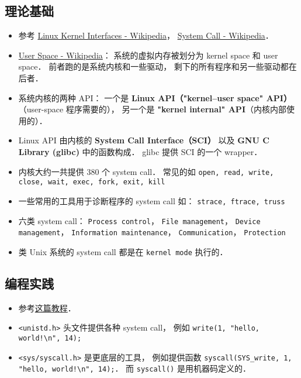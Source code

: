 
\begin{issues}
\issueDraft
\end{issues}

\subsection{理论基础}
\begin{itemize}
\item 参考 \href{https://en.wikipedia.org/wiki/Linux_kernel_interfaces}{Linux Kernel Interfaces - Wikipedia}， \href{https://en.wikipedia.org/wiki/System_call}{System Call - Wikipedia}．
\item \href{https://en.wikipedia.org/wiki/User_space_and_kernel_space}{User Space - Wikipedia}： 系统的虚拟内存被划分为 kernel space 和 user space． 前者跑的是系统内核和一些驱动， 剩下的所有程序和另一些驱动都在后者．
\item 系统内核的两种 API： 一个是 \textbf{Linux API（"kernel–user space" API）}（user-space 程序需要的）， 另一个是 \textbf{"kernel internal" API}（内核内部使用的）．
\item Linux API 由内核的 \textbf{System Call Interface（SCI）} 以及 \textbf{GNU C Library (glibc)} 中的函数构成． glibc 提供 SCI 的一个 wrapper．
\item 内核大约一共提供 380 个 system call． 常见的如 \verb|open, read, write, close, wait, exec, fork, exit, kill|
\item 一些常用的工具用于诊断程序的 system call 如： \verb|strace, ftrace, truss|
\item 六类 system call： \verb|Process control|， \verb|File management|， \verb|Device management|， \verb|Information maintenance|， \verb|Communication|， \verb|Protection|
\item 类 Unix 系统的 system call 都是在 \verb|kernel mode| 执行的．
\end{itemize}

\subsection{编程实践}
\begin{itemize}
\item 参考\href{https://jameshfisher.com/2018/02/19/how-to-syscall-in-c/}{这篇教程}．
\item \verb|<unistd.h>| 头文件提供各种 system call， 例如 \verb|write(1, "hello, world!\n", 14);|
\item \verb|<sys/syscall.h>| 是更底层的工具， 例如提供函数 \verb|syscall(SYS_write, 1, "hello, world!\n", 14);|． 而 \verb|syscall()| 是用机器码定义的．
\end{itemize}

